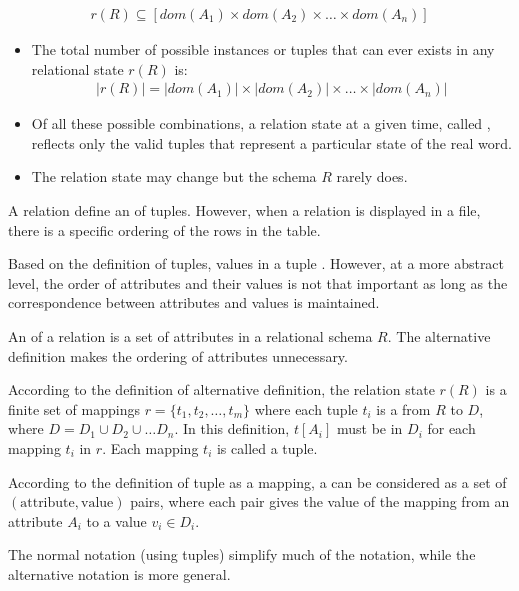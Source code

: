       \begin{align*}
        r(R) \subseteq [dom(A_1) \times dom(A_2) \times \ldots \times dom(A_n)]
      \end{align*}
    \begin{itemize}
      \item The total number of possible instances or tuples that can ever exists in any relational state $r(R)$ is:
        \begin{align*}
          |r(R)| = |dom(A_1)| \times |dom(A_2)| \times \ldots \times |dom(A_n)|
        \end{align*}
      \item Of all these possible combinations, a relation state at a given time, called , reflects only the valid tuples that represent a particular state of the real word.
      \item The relation state may change but the schema $R$ rarely does.
    \end{itemize}

      \par A relation  define an  of tuples. However, when a relation is displayed in a file, there is a specific ordering of the rows in the table.

      \par Based on the definition of tuples, values in a tuple . However, at a more abstract level, the order of attributes and their values is not that important as long as the correspondence between attributes and values is maintained.
      \par An  of a relation is a set of attributes in a relational schema $R$. The alternative definition makes the ordering of attributes unnecessary.
      \par According to the definition of alternative definition, the relation state $r(R)$ is a finite set of mappings $r = \{t_1, t_2, \ldots, t_m\}$ where each tuple $t_i$ is a  from $R$ to $D$, where $D = D_1 \cup D_2 \cup \ldots D_n$. In this definition, $t[A_i]$ must be in $D_i$ for each mapping $t_i$ in $r$. Each mapping $t_i$ is called a tuple.
      \par According to the definition of tuple as a mapping, a  can be considered as a set of $(\mbox{attribute}, \mbox{value})$ pairs, where each pair gives the value of the mapping from an attribute $A_i$ to a value $v_i \in D_i$.
      \par The normal notation (using tuples) simplify much of the notation, while the alternative notation is more general.


